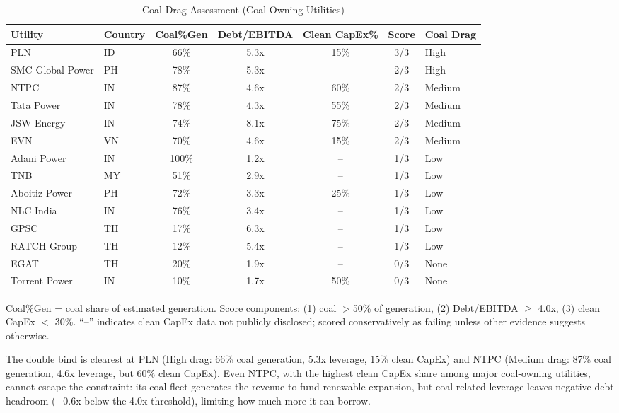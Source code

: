 \documentclass[review,3p,authoryear]{elsarticle}
\begin{document}
\begin{table}[H]
\centering
\caption{Coal Drag Assessment (Coal-Owning Utilities)}
\label{tab:coal_drag}
\small
\begin{adjustbox}{max width=\linewidth}
\begin{tabular}{@{}llccccl@{}}
\toprule
\textbf{Utility} & \textbf{Country} & \textbf{Coal\%Gen} & \textbf{Debt/EBITDA} & \textbf{Clean CapEx\%} & \textbf{Score} & \textbf{Coal Drag} \\
\midrule
PLN & ID & 66\% & 5.3x & 15\% & 3/3 & High \\
SMC Global Power & PH & 78\% & 5.3x & -- & 2/3 & High \\
NTPC & IN & 87\% & 4.6x & 60\% & 2/3 & Medium \\
Tata Power & IN & 78\% & 4.3x & 55\% & 2/3 & Medium \\
JSW Energy & IN & 74\% & 8.1x & 75\% & 2/3 & Medium \\
EVN & VN & 70\% & 4.6x & 15\% & 2/3 & Medium \\
Adani Power & IN & 100\% & 1.2x & -- & 1/3 & Low \\
TNB & MY & 51\% & 2.9x & -- & 1/3 & Low \\
Aboitiz Power & PH & 72\% & 3.3x & 25\% & 1/3 & Low \\
NLC India & IN & 76\% & 3.4x & -- & 1/3 & Low \\
GPSC & TH & 17\% & 6.3x & -- & 1/3 & Low \\
RATCH Group & TH & 12\% & 5.4x & -- & 1/3 & Low \\
EGAT & TH & 20\% & 1.9x & -- & 0/3 & None \\
Torrent Power & IN & 10\% & 1.7x & 50\% & 0/3 & None \\
\bottomrule
\end{tabular}
\end{adjustbox}
\begin{flushleft}
\footnotesize{Coal\%Gen = coal share of estimated generation. Score components: (1) coal $>$50\% of generation, (2) Debt/EBITDA $\geq$ 4.0x, (3) clean CapEx $<$ 30\%. ``--'' indicates clean CapEx data not publicly disclosed; scored conservatively as failing unless other evidence suggests otherwise.}
\end{flushleft}
\end{table}

The double bind is clearest at PLN (High drag: 66\% coal generation, 5.3x leverage, 15\% clean CapEx) and NTPC (Medium drag: 87\% coal generation, 4.6x leverage, but 60\% clean CapEx). Even NTPC, with the highest clean CapEx share among major coal-owning utilities, cannot escape the constraint: its coal fleet generates the revenue to fund renewable expansion, but coal-related leverage leaves negative debt headroom ($-$0.6x below the 4.0x threshold), limiting how much more it can borrow.
\end{document}
